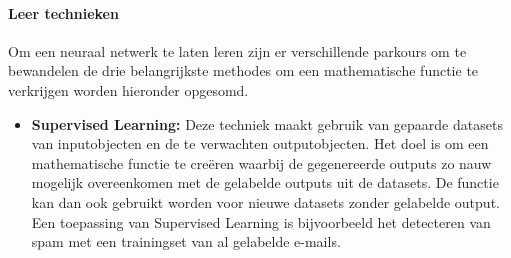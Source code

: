 		\paragraph{Leer technieken}
		Om een neuraal netwerk te laten leren zijn er verschillende parkours om te bewandelen de drie belangrijkste methodes om een mathematische functie te verkrijgen worden hieronder opgesomd.
		\begin{itemize}
			\item \textbf{Supervised Learning:} Deze techniek maakt gebruik van gepaarde datasets van inputobjecten en de te verwachten outputobjecten. Het doel is om een mathematische functie te cre\"eren waarbij de gegenereerde outputs zo nauw mogelijk overeenkomen met de gelabelde outputs uit de datasets. De functie kan dan ook gebruikt worden voor nieuwe datasets zonder gelabelde output. Een toepassing van Supervised Learning is bijvoorbeeld het detecteren van spam met een trainingset van al gelabelde e-mails.
			

\end{itemize}
